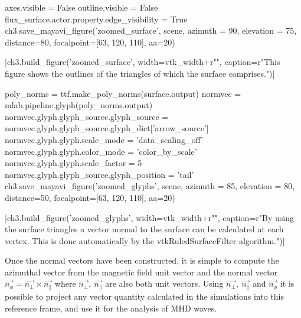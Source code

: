 \begin{pycode}[chapter3]
axes.visible = False
outline.visible = False
flux_surface.actor.property.edge_visibility = True
ch3.save_mayavi_figure('zoomed_surface', scene, azimuth = 90, elevation = 75, distance=80, focalpoint=[63, 120, 110], aa=20)
\end{pycode}
\py[chapter3]|ch3.build_figure('zoomed_surface', width=vtk_width+r"\columnwidth",
caption=r"This figure shows the outlines of the triangles of which the surface comprises.")|


\begin{pycode}[chapter3]
poly_norms = ttf.make_poly_norms(surface.output)
normvec = mlab.pipeline.glyph(poly_norms.output)
normvec.glyph.glyph_source.glyph_source = normvec.glyph.glyph_source.glyph_dict['arrow_source']
normvec.glyph.glyph.scale_mode = 'data_scaling_off'
normvec.glyph.glyph.color_mode = 'color_by_scale'
normvec.glyph.glyph.scale_factor = 5
normvec.glyph.glyph_source.glyph_position = 'tail'
ch3.save_mayavi_figure('zoomed_glyphs', scene, azimuth = 85, elevation = 80, distance=50, focalpoint=[63, 120, 110], aa=20)
\end{pycode}
\py[chapter3]|ch3.build_figure('zoomed_glyphs', width=vtk_width+r"\columnwidth",
caption=r"By using the surface triangles a vector normal to the surface can be calculated at each vertex. This is done automatically by the vtkRuledSurfaceFilter algorithm.")|

Once the normal vectors have been constructed, it is simple to compute the azimuthal vector from the magnetic field unit vector and the normal vector $\vec{n_\phi}= \vec{n_\perp} \times \vec{n_\parallel}$ where $\vec{n_\perp},\ \vec{n_\parallel} $ are also both unit vectors. 
Using  $\vec{n_\perp},\ \vec{n_\parallel}$ and $\vec{n_\phi}$ it  is possible to project any vector quantity calculated in the simulations into this reference frame, and use it for the analysis of MHD waves.
